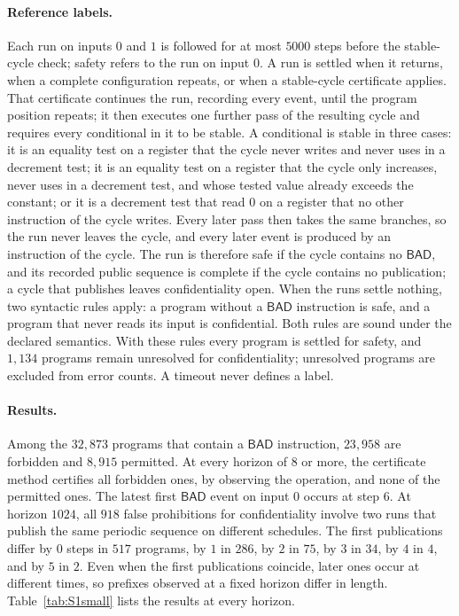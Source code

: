 \documentclass[11pt]{article}
\newcommand{\bad}{\mathsf{BAD}}
\begin{document}
\paragraph{Reference labels.} Each run on inputs $0$ and $1$ is followed for at most $5000$ steps before the stable-cycle check; safety refers to the run on input $0$. A run is settled when it returns, when a complete configuration repeats, or when a stable-cycle certificate applies. That certificate continues the run, recording every event, until the program position repeats; it then executes one further pass of the resulting cycle and requires every conditional in it to be stable. A conditional is stable in three cases: it is an equality test on a register that the cycle never writes and never uses in a decrement test; it is an equality test on a register that the cycle only increases, never uses in a decrement test, and whose tested value already exceeds the constant; or it is a decrement test that read $0$ on a register that no other instruction of the cycle writes. Every later pass then takes the same branches, so the run never leaves the cycle, and every later event is produced by an instruction of the cycle. The run is therefore safe if the cycle contains no $\bad$, and its recorded public sequence is complete if the cycle contains no publication; a cycle that publishes leaves confidentiality open. When the runs settle nothing, two syntactic rules apply: a program without a $\bad$ instruction is safe, and a program that never reads its input is confidential. Both rules are sound under the declared semantics. With these rules every program is settled for safety, and $1{,}134$ programs remain unresolved for confidentiality; unresolved programs are excluded from error counts. A timeout never defines a label.

\paragraph{Results.} Among the $32{,}873$ programs that contain a $\bad$ instruction, $23{,}958$ are forbidden and $8{,}915$ permitted. At every horizon of $8$ or more, the certificate method certifies all forbidden ones, by observing the operation, and none of the permitted ones. The latest first $\bad$ event on input $0$ occurs at step $6$. At horizon $1024$, all $918$ false prohibitions for confidentiality involve two runs that publish the same periodic sequence on different schedules. The first publications differ by $0$ steps in $517$ programs, by $1$ in $286$, by $2$ in $75$, by $3$ in $34$, by $4$ in $4$, and by $5$ in $2$. Even when the first publications coincide, later ones occur at different times, so prefixes observed at a fixed horizon differ in length. Table~\ref{tab:S1small} lists the results at every horizon.
\end{document}
